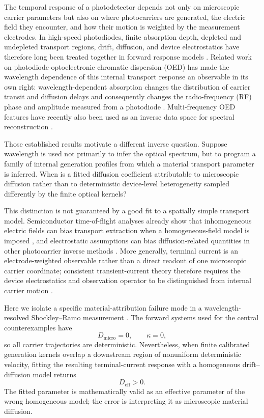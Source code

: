 \documentclass[aps,pra,twocolumn,superscriptaddress,nofootinbib]{revtex4-2}
\newcommand{\Deff}{D_{\mathrm{eff}}}
\newcommand{\Dmicro}{D_{\mathrm{micro}}}
\begin{document}
The temporal response of a photodetector depends not only on microscopic carrier parameters but also on where photocarriers are generated, the electric field they encounter, and how their motion is weighted by the measurement electrodes. In high-speed photodiodes, finite absorption depth, depleted and undepleted transport regions, drift, diffusion, and device electrostatics have therefore long been treated together in forward response models \cite{hu2015pda}. Related work on photodiode optoelectronic chromatic dispersion (OED) has made the wavelength dependence of this internal transport response an observable in its own right: wavelength-dependent absorption changes the distribution of carrier transit and diffusion delays and consequently changes the radio-frequency (RF) phase and amplitude measured from a photodiode \cite{glasser2021oed,liokumovitch2021germanium,liokumovitch2022femtometer,dutta2024pin,mudgal2024pn}. Multi-frequency OED features have recently also been used as an inverse data space for spectral reconstruction \cite{kassa2026spectroscopy}.

Those established results motivate a different inverse question. Suppose wavelength is used not primarily to infer the optical spectrum, but to program a family of internal generation profiles from which a material transport parameter is inferred. When is a fitted diffusion coefficient attributable to microscopic diffusion rather than to deterministic device-level heterogeneity sampled differently by the finite optical kernels?

This distinction is not guaranteed by a good fit to a spatially simple transport model. Semiconductor time-of-flight analyses already show that inhomogeneous electric fields can bias transport extraction when a homogeneous-field model is imposed \cite{emelianova2006tof}, and electrostatic assumptions can bias diffusion-related quantities in other photocarrier inverse methods \cite{hattori1992sspg}. More generally, terminal current is an electrode-weighted observable rather than a direct readout of one microscopic carrier coordinate; consistent transient-current theory therefore requires the device electrostatics and observation operator to be distinguished from internal carrier motion \cite{hawks2015current}.

Here we isolate a specific material-attribution failure mode in a wavelength-resolved Shockley--Ramo measurement \cite{shockley1938,ramo1939}. The forward systems used for the central counterexamples have
\begin{equation}
\Dmicro=0,
\qquad
\kappa=0,
\end{equation}
so all carrier trajectories are deterministic. Nevertheless, when finite calibrated generation kernels overlap a downstream region of nonuniform deterministic velocity, fitting the resulting terminal-current response with a homogeneous drift--diffusion model returns
\begin{equation}
\Deff>0.
\end{equation}
The fitted parameter is mathematically valid as an effective parameter of the wrong homogeneous model; the error is interpreting it as microscopic material diffusion.
\end{document}
